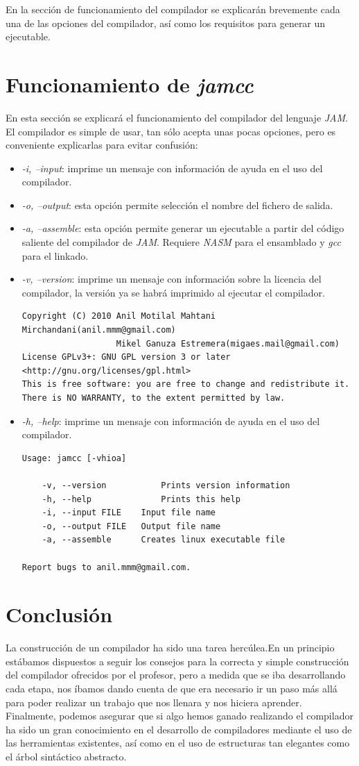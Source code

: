 \documentclass[a4paper,10pt]{article}
\begin{document}
En la sección de funcionamiento del compilador se explicarán brevemente cada una de las opciones del compilador, así como los requisitos para generar un ejecutable.
\section{Funcionamiento de \textit{jamcc}}
En esta sección se explicará el funcionamiento del compilador del lenguaje \textit{JAM}. El compilador es simple de usar, tan sólo acepta unas pocas opciones, pero es conveniente explicarlas para evitar confusión:
\begin{itemize}
\item \emph{-i, --input}: imprime un mensaje con información de ayuda en el uso del compilador.
\item \emph{-o, --output}: esta opción permite selección el nombre del fichero de salida.
\item \emph{-a, --assemble}: esta opción permite generar un ejecutable a partir del código saliente del compilador de \textit{JAM}. Requiere \textit{NASM} para el ensamblado y \textit{gcc} para el linkado.
\item \emph{-v, --version}: imprime un mensaje con información sobre la licencia del compilador, la versión ya se habrá imprimido al ejecutar el compilador.

\begin{lstlisting}
Copyright (C) 2010 Anil Motilal Mahtani Mirchandani(anil.mmm@gmail.com)
                   Mikel Ganuza Estremera(migaes.mail@gmail.com)
License GPLv3+: GNU GPL version 3 or later <http://gnu.org/licenses/gpl.html>
This is free software: you are free to change and redistribute it.
There is NO WARRANTY, to the extent permitted by law.
\end{lstlisting}
\item \emph{-h, --help}: imprime un mensaje con información de ayuda en el uso del compilador.
\begin{lstlisting}
Usage: jamcc [-vhioa]

	-v, --version			Prints version information
	-h, --help				Prints this help
	-i, --input FILE	Input file name
	-o, --output FILE	Output file name
	-a, --assemble		Creates linux executable file

Report bugs to anil.mmm@gmail.com.
\end{lstlisting}
\end{itemize}

\section{Conclusión}
La construcción de un compilador ha sido una tarea hercúlea.En un principio estábamos dispuestos a seguir los consejos para la correcta y simple construcción del compilador ofrecidos por el profesor, pero a medida que se iba desarrollando cada etapa, nos íbamos dando cuenta de que era necesario ir un paso más allá para poder realizar un trabajo que nos llenara y nos hiciera aprender. Finalmente, podemos asegurar que si algo hemos ganado realizando el compilador ha sido un gran conocimiento en el desarrollo de compiladores mediante el uso de las herramientas existentes, así como en el uso de estructuras tan elegantes como el árbol sintáctico abstracto.
\end{document}
